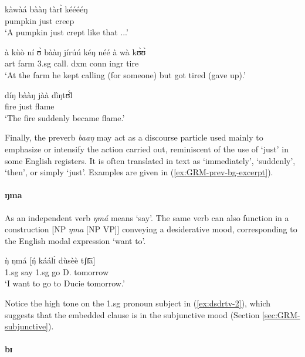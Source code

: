 \begin{exe}
\begin{exe}
\begin{exe}
{\begin{exe}
\begin{exe}
\begin{exe}
\begin{exe}
\begin{exe}
\begin{exe}
\begin{exe}
\begin{xlist}
\begin{exe}
\begin{exe}
\begin{exe}
\begin{exe}
\begin{exe}
\begin{exe}
\begin{exe}
\begin{exe}
\begin{exe}
\begin{exe}
\begin{exe}
\begin{exe}
\begin{exe}
\begin{exe}
\ex
\gll kàwàá bààŋ tàrɪ̀ kééééŋ \\
pumpkin just creep {\dxm}\\
\glt `A pumpkin just crept like that ...' 

\ex
\gll à kùò ní ʊ̀ bààŋ jírúú kéŋ néé à wà kʊ̀ʊ̀ \\
{\sc art} farm {\postp}  {\sc 3.sg} {\mod} call.{\ipfv} {\sc dxm} {\foc} {\sc 
conn} {\sc ingr} tire  \\
\glt `At the farm he kept calling (for someone) but got tired (gave up).'


\ex
\gll díŋ bààŋ jàà dìŋtʊ́l̀\\
fire  just {\ident} flame\\
\glt `The fire suddenly became flame.'

 \z 
 \z

 Finally, the preverb  {\it baaŋ} may act as a discourse particle used mainly 
to 
emphasize or intensify the action carried out, reminiscent of  the use of 
`just' 
in some English registers.  It is often translated in text as `immediately', 
`suddenly', `then',  or simply `just'. Examples are given in 
(\ref{ex:GRM-prev-bg-excerpt}).


\paragraph{ŋma}
\label{sec:GRM-desiderative mood}

As an independent verb {\it ŋmá} means `say'. The same verb can also 
function in a construction [NP {\it ŋma} [NP VP]]  conveying a desiderative 
mood,  corresponding to the English modal expression `want to'.



\ea\label{ex:dsdrtv-2}
\gll ŋ̀ ŋmá [ŋ́ káálɪ̀ dùsèè tʃɪ̄ā]\\
  {\sc 1.sg} say     {\sc 1.sg} go D. tomorrow   \\
\glt  `I want to go to Ducie tomorrow.'
\z 
 
 Notice the high tone on the  {\sc 1.sg} pronoun subject  
in (\ref{ex:dsdrtv-2}),  which suggests that the embedded clause is in the 
subjunctive mood (Section 
\ref{sec:GRM-subjunctive}).

\paragraph{bɪ}
\label{sec:GRM-preverb-iteration}


\end{exe}
\end{exe}
\end{exe}
\end{exe}
\end{exe}
\end{exe}
\end{exe}
\end{exe}
\end{exe}
\end{exe}
\end{exe}
\end{exe}
\end{exe}
\end{exe}
\end{xlist}
\end{exe}
\end{exe}
\end{exe}
\end{exe}
\end{exe}
\end{exe}
\end{exe}}
\end{exe}
\end{exe}
\end{exe}

